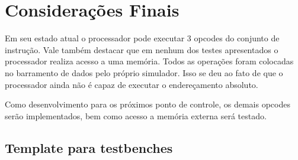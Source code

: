 \documentclass[
	12pt,				  %
	openright,		%
	a4paper,			%
	english,			%
	french,				%
	spanish,			%
	brazil,				%
]{abntex2}
\begin{document}
\chapter{Considerações Finais}

Em seu estado atual o processador pode executar 3 opcodes do conjunto de instrução.
Vale também destacar que em nenhum dos testes apresentados o processador realiza acesso a uma memória.
Todos as operações foram colocadas no barramento de dados pelo próprio simulador.
Isso se deu ao fato de que o processador ainda não é capaz de executar o endereçamento absoluto.

Como desenvolvimento para os próximos ponto de controle, os demais opcodes serão implementados,
bem como acesso a memória externa será testado.



\postextual





\begin{apendicesenv}

	\partapendices

\end{apendicesenv}



\begin{anexosenv}
	\chapter{Template para testbenches}\label{attach:template}
	\inputminted{systemverilog}{../quartus/testbenches/template.test.sv}
\end{anexosenv}


\clearpage



\printindex
\end{document}
